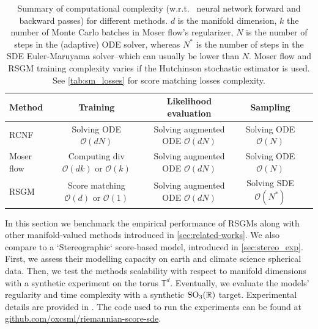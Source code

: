 \label{sec:experiments-rsgm}
\begin{table}[t]
	\centering
	\small
	\renewcommand*{\arraystretch}{1.4}
	\begin{tabular}{l|cccc}
		\toprule
		Method     & Training                                                     & Likelihood evaluation                   & Sampling                     \\
		\midrule
		RCNF       & Solving ODE $\mathcal{O}(dN)$                                & Solving augmented ODE $\mathcal{O}(dN)$ & Solving ODE $\mathcal{O}(N)$ \\
		Moser flow & Computing $\text{div}$ $\mathcal{O}(dk)$ or $\mathcal{O}(k)$ & Solving augmented ODE $\mathcal{O}(dN)$ & Solving ODE $\mathcal{O}(N)$ \\ RSGM & Score matching $\mathcal{O}(d)$ or $\mathcal{O}(1)$ & Solving augmented ODE $\mathcal{O}(dN)$ & Solving SDE $\mathcal{O}(N^*)$ \\ \bottomrule\end{tabular}

	\caption{ \small Summary of computational complexity (w.r.t. \ neural network forward and backward passes) for different methods.
		$d$ is the manifold
		dimension, $k$ the number of Monte Carlo batches in Moser flow's regularizer,
		$N$ is the number of steps in the (adaptive) ODE solver, whereas $N^*$ is the
		number of steps in the SDE Euler-Maruyama solver--which can usually be lower
		than $N$.
		Moser flow and RSGM training complexity varies if the Hutchinson stochastic estimator is used.
		See \cref{tab:sm_losses} for score matching losses complexity.
	}
	\label{tab:comparison_methods}
\end{table}
In this section we benchmark the empirical performance of RSGMs along with other manifold-valued methods introduced in \cref{sec:related-works}.
We also compare to a `Stereographic` score-based model, introduced in \cref{sec:stereo_exp}.
First, we assess their modelling capacity on earth and climate science spherical data.
Then, we test the methods scalability with respect to manifold dimensions with a synthetic experiment on the torus $\mathbb{T}^d$.
Eventually, we evaluate the models' regularity and time complexity with a synthetic $\mathrm{SO}_3(\mathbb{R})$ target.
Experimental details are provided in .
The code used to run the experiments can be found at \href{https://github.com/oxcsml/riemannian-score-sde}{github.com/oxcsml/riemannian-score-sde}.


